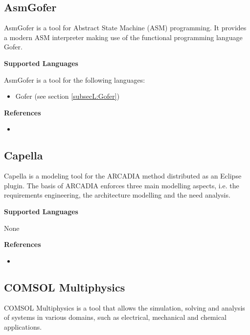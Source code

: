 \subsection{AsmGofer}
\label{subsecT:AsmGofer}


AsmGofer is a tool for Abstract State Machine (ASM) programming. It provides a modern ASM interpreter making use of the functional programming language Gofer.

\textbf{Supported Languages}

AsmGofer is a tool for the following languages:
\begin{itemize}
	\item Gofer (see section \ref{subsecL:Gofer})
\end{itemize}


\textbf{References}
\begin{itemize}
	
\item {}
\end{itemize}



\subsection{Capella}
\label{subsecT:Capella}


Capella is a  modeling tool for the ARCADIA method distributed as an Eclipse plugin. The basis of ARCADIA enforces three main modelling aspects, i.e. the requirements engineering, the architecture modelling and the need analysis.

\textbf{Supported Languages}

None


\textbf{References}
\begin{itemize}
	
\item {}
\end{itemize}



\subsection{COMSOL Multiphysics}
\label{subsecT:COMSOL}


COMSOL Multiphysics is a tool that allows the simulation, solving and analysis of systems in various domains, such as electrical, mechanical and chemical applications.

